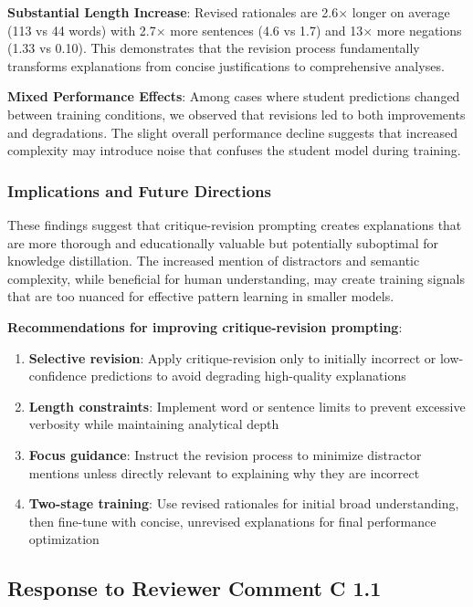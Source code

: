 \textbf{Substantial Length Increase}: Revised rationales are 2.6× longer on average (113 vs 44 words) with 2.7× more sentences (4.6 vs 1.7) and 13× more negations (1.33 vs 0.10). This demonstrates that the revision process fundamentally transforms explanations from concise justifications to comprehensive analyses.

\textbf{Mixed Performance Effects}: Among cases where student predictions changed between training conditions, we observed that revisions led to both improvements and degradations. The slight overall performance decline suggests that increased complexity may introduce noise that confuses the student model during training.

\subsubsection{Implications and Future Directions}

These findings suggest that critique-revision prompting creates explanations that are more thorough and educationally valuable but potentially suboptimal for knowledge distillation. The increased mention of distractors and semantic complexity, while beneficial for human understanding, may create training signals that are too nuanced for effective pattern learning in smaller models.

\textbf{Recommendations for improving critique-revision prompting}:
\begin{enumerate}
    \item \textbf{Selective revision}: Apply critique-revision only to initially incorrect or low-confidence predictions to avoid degrading high-quality explanations
    \item \textbf{Length constraints}: Implement word or sentence limits to prevent excessive verbosity while maintaining analytical depth
    \item \textbf{Focus guidance}: Instruct the revision process to minimize distractor mentions unless directly relevant to explaining why they are incorrect
    \item \textbf{Two-stage training}: Use revised rationales for initial broad understanding, then fine-tune with concise, unrevised explanations for final performance optimization
\end{enumerate}

\subsection{Response to Reviewer Comment C 1.1}

